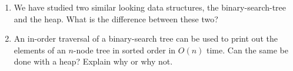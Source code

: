 \begin{enumerate}
\item  We have studied two similar looking data structures, the
binary-search-tree and the heap. What is the difference between these
two?

\item  An in-order traversal of a binary-search tree can be used to print out
the elements of an $n$-node tree in sorted order in $O(n)$ time. Can
the same be done with a heap? Explain why or why not.
\end{enumerate}

